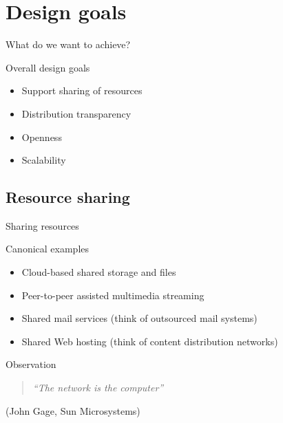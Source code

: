 \section{Design goals}
\begin{slide}{What do we want to achieve?}
  \begin{block}{Overall design goals}
    \begin{itemize}
    \item Support sharing of resources
    \item Distribution transparency
    \item Openness
    \item Scalability
    \end{itemize}
  \end{block}
\end{slide}
\subsection{Resource sharing}
\begin{slide}{Sharing resources}
  \begin{exampleblock}{Canonical examples}
    \begin{itemize}\firmlist
    \item Cloud-based shared storage and files
    \item Peer-to-peer assisted multimedia streaming
    \item Shared mail services (think of outsourced mail systems)
    \item Shared Web hosting (think of content distribution networks)
    \end{itemize}
  \end{exampleblock}
  \begin{block}{Observation}
    \begin{quote}\itshape
      ``The network is the computer''
    \end{quote}
    (John Gage, Sun Microsystems)
  \end{block}
\end{slide}
